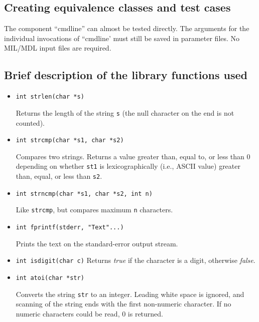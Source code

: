 \subsection*{Creating equivalence classes and test cases}

The component ``cmdline'' can almost be tested directly.
The arguments for the individual invocations of ``cmdline'
must still be saved in parameter files.
No MIL/MDL input files are required.

\newpage
{}

\subsection*{Brief description of the library functions used}

\begin{itemize}

\item {\tt int strlen(char *s)}

Returns the length of the string {\tt s} (the null character on the end
is not counted).

\item {\tt int strcmp(char *s1, char *s2)}

Compares two strings.  Returns a value greater than, equal to, or less
than 0 depending on whether {\tt st1} is lexicographically (i.e.,
ASCII value) greater than, equal, or less than {\tt s2}.

\item {\tt int strncmp(char *s1, char *s2, int n)}

Like {\tt strcmp}, but compares maximum {\tt n} characters.

\item {\tt int fprintf(stderr, "Text"...)}

Prints the text on the standard-error output stream.

\item {\tt int isdigit(char c)}
Returns {\em true} if the character is a digit, otherwise {\em false}.

\item {\tt int atoi(char *str)}

Converts the string {\tt str} to an integer.
Leading white space is ignored, and scanning of the string ends
with the first non-numeric character.
If no numeric characters could be read, 0 is returned.

\end{itemize}

